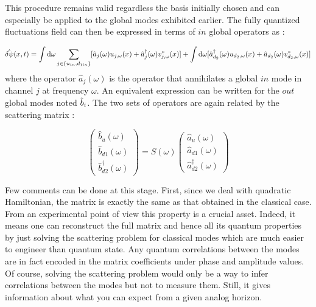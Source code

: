 This procedure remains valid regardless the basis initially chosen and can especially be applied to the global modes exhibited earlier. The fully quantized fluctuations field can then be expressed in terms of $in$ global operators as \cite{Recati_acousticHR_2009}:

\begin{equation}
    \hat{\delta\psi}(x,t) = \int \mathrm{d}\omega\sum_{j\in \{u_{in},d_{1in}\} }[\hat{a}_j(\omega)u_{j,\omega}(x)+\hat{a}^\dagger_j(\omega)v^*_{j,\omega}(x)] + \int \mathrm{d}\omega[\hat{a}^\dagger_{d_2}(\omega)u_{d_2,\omega}(x)+\hat{a}_{d_2}(\omega)v^*_{d_2,\omega}(x)]
    \label{eq:fluctuation_quantization}
\end{equation}
where the operator $\hat{a}_j(\omega)$ is the operator that annihilates a global $in$ mode in channel $j$ at frequency $\omega$. An equivalent
expression can be written for the $out$ global modes noted $\hat{b}_i$. The two sets of operators are again related by the scattering matrix :

\begin{equation}
    \begin{pmatrix}
        \hat{b}_u(\omega) \\
        \hat{b}_{d1}(\omega) \\
        \hat{b}_{d2}^\dagger(\omega)
    \end{pmatrix}=S(\omega)\begin{pmatrix}
        \hat{a}_u(\omega) \\
        \hat{a}_{d1}(\omega) \\
        \hat{a}_{d2}^\dagger(\omega)    
    \end{pmatrix}
\end{equation}


Few comments can be done at this stage. First, since we deal with quadratic Hamiltonian, the matrix is exactly the same as that obtained in the classical case.
From an experimental point of view this property is a crucial asset. Indeed, it means one can reconstruct the full matrix and hence all its quantum 
properties by just solving the scattering problem for classical modes which are much easier to engineer than quantum state. Any quantum correlations between the modes are in fact encoded in the matrix coefficients 
under phase and amplitude values. Of course, solving the scattering problem
would only be a way to infer correlations between the modes but not to measure them. Still, it gives information about what you can expect from a given 
analog horizon.

\bigskip

